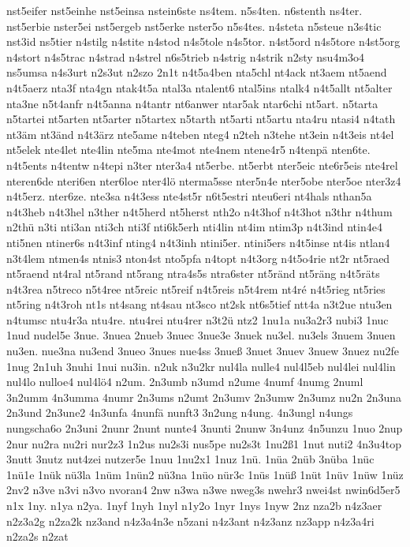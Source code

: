 {nst5eifer
nst5einhe
nst5einsa
nstein6ste
ns4tem.
n5s4ten.
n6stenth
ns4ter.
nst5erbie
nster5ei
nst5ergeb
nst5erke
nster5o
n5s4tes.
n4steta
n5steue
n3s4tic
nst3id
ns5tier
n4stilg
n4stite
n4stod
n4s5tole
n4s5tor.
n4st5ord
n4s5tore
n4st5org
n4stort
n4s5trac
n4strad
n4strel
n6s5trieb
n4strig
n4strik
n2sty
nsu4m3o4
ns5umsa
n4s3urt
n2s3ut
n2szo
2n1t
n4t5a4ben
nta5chl
nt4ack
nt3aem
nt5aend
n4t5aerz
nta3f
nta4gn
ntak4t5a
ntal3a
ntalent6
ntal5ins
ntalk4
n4t5allt
nt5alter
nta3ne
n5t4anfr
n4t5anna
n4tantr
nt6anwer
ntar5ak
ntar6chi
nt5art.
n5tarta
n5tartei
nt5arten
nt5arter
n5tartex
n5tarth
nt5arti
nt5artu
nta4ru
ntasi4
n4tath
nt3äm
nt3änd
n4t3ärz
nte5ame
n4teben
nteg4
n2teh
n3tehe
nt3ein
n4t3eis
nt4el
nt5elek
nte4let
nte4lin
nte5ma
nte4mot
nte4nem
ntene4r5
n4tenpä
nten6te.
n4t5ents
n4tentw
n4tepi
n3ter
nter3a4
nt5erbe.
nt5erbt
nter5eic
nte6r5eis
nte4rel
nteren6de
nteri6en
nter6loe
nter4lö
nterma5sse
nter5n4e
nter5obe
nter5oe
nter3z4
n4t5erz.
nter6ze.
nte3sa
n4t3ess
nte4st5r
n6t5estri
nteu6eri
nt4hals
nthan5a
n4t3heb
n4t3hel
n3ther
n4t5herd
nt5herst
nth2o
n4t3hof
n4t3hot
n3thr
n4thum
n2thü
n3ti
nti3an
nti3ch
nti3f
nti6k5erh
nti4lin
nt4im
ntim3p
n4t3ind
ntin4e4
nti5nen
ntiner6s
n4t3inf
nting4
n4t3inh
ntini5er.
ntini5ers
n4t5inse
nt4is
ntlan4
n3t4lem
ntmen4s
ntnis3
nton4st
nto5pfa
n4topt
n4t3org
n4t5o4rie
nt2r
nt5raed
nt5raend
nt4ral
nt5rand
nt5rang
ntra4s5s
ntra6ster
nt5ränd
nt5räng
n4t5räts
n4t3rea
n5treco
n5t4ree
nt5reic
nt5reif
n4t5reis
n5t4rem
nt4ré
n4t5rieg
nt5ries
nt5ring
n4t3roh
nt1s
nt4sang
nt4sau
nt3sco
nt2sk
nt6s5tief
ntt4a
n3t2ue
ntu3en
n4tumsc
ntu4r3a
ntu4re.
ntu4rei
ntu4rer
n3t2ü
ntz2
1nu1a
nu3a2r3
nubi3
1nuc
1nud
nudel5e
3nue.
3nuea
2nueb
3nuec
3nue3e
3nuek
nu3el.
nu3els
3nuem
3nuen
nu3en.
nue3na
nu3end
3nueo
3nues
nue4ss
3nueß
3nuet
3nuev
3nuew
3nuez
nu2fe
1nug
2n1uh
3nuhi
1nui
nu3in.
n2uk
n3u2kr
nul4la
nulle4
nul4l5eb
nul4lei
nul4lin
nul4lo
nulloe4
nul4lö4
n2um.
2n3umb
n3umd
n2ume
4numf
4numg
2numl
3n2umm
4n3umma
4numr
2n3ums
n2umt
2n3umv
2n3umw
2n3umz
nu2n
2n3una
2n3und
2n3une2
4n3unfa
4nunfä
nunft3
3n2ung
n4ung.
4n3ungl
n4ungs
nungscha6o
2n3uni
2nunr
2nunt
nunte4
3nunti
2nunw
3n4unz
4n5unzu
1nuo
2nup
2nur
nu2ra
nu2ri
nur2z3
1n2us
nu2s3i
nus5pe
nu2s3t
1nu2ß1
1nut
nuti2
4n3u4top
3nutt
3nutz
nut4zei
nutzer5e
1nuu
1nu2x1
1nuz
1nü.
1nüa
2nüb
3nüba
1nüc
1nü1e
1nük
nü3la
1nüm
1nün2
nü3na
1nüo
nür3c
1nüs
1nüß
1nüt
1nüv
1nüw
1nüz
2nv2
n3ve
n3vi
n3vo
nvoran4
2nw
n3wa
n3we
nweg3s
nwehr3
nwei4st
nwin6d5er5
n1x
1ny.
n1ya
n2ya.
1nyf
1nyh
1nyl
n1y2o
1nyr
1nys
1nyw
2nz
nza2b
n4z3aer
n2z3a2g
n2za2k
nz3and
n4z3a4n3e
n5zani
n4z3ant
n4z3anz
nz3app
n4z3a4ri
n2za2s
n2zat
}
